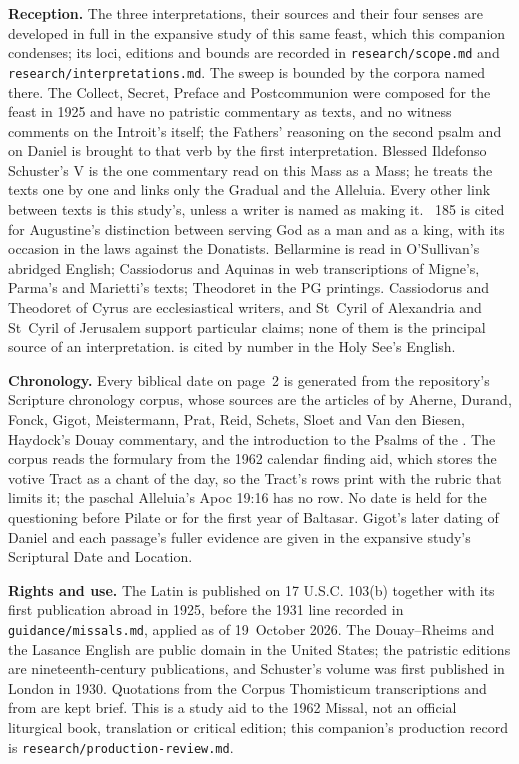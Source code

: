 {\textbf{Reception.} The three interpretations, their sources and their four senses
are developed in full in the expansive study of this same feast, which this
companion condenses; its loci, editions and bounds are recorded in
\texttt{research/scope.md} and \texttt{research/interpretations.md}. The sweep
is bounded by the corpora named there. The Collect, Secret, Preface and
Postcommunion were composed for the feast in 1925 and have no patristic
commentary as texts, and no witness comments on the Introit's
 itself; the Fathers' reasoning on the
second psalm and on Daniel is brought to that verb by the first interpretation.
Blessed Ildefonso Schuster's  V is the one commentary
read on this Mass as a Mass; he treats the texts one by one and links only the
Gradual and the Alleluia. Every other link between texts is this study's,
unless a writer is named as making it. ~185 is cited for Augustine's
distinction between serving God as a man and as a king, with its occasion in
the laws against the Donatists. Bellarmine is read in O'Sullivan's abridged
English; Cassiodorus and Aquinas in web transcriptions of Migne's, Parma's and
Marietti's texts; Theodoret in the PG printings. Cassiodorus and Theodoret
of Cyrus are ecclesiastical writers, and St~Cyril of Alexandria and St~Cyril
of Jerusalem support particular claims; none of them is the principal source
of an interpretation.
 is cited by number in the Holy See's English.

\textbf{Chronology.} Every biblical date on page~2 is generated from the
repository's Scripture chronology corpus, whose sources are the articles of
 by Aherne, Durand, Fonck, Gigot, Meistermann,
Prat, Reid, Schets, Sloet and Van den Biesen, Haydock's Douay commentary, and
the introduction to the Psalms of the . The corpus reads the formulary from the 1962 calendar finding aid,
which stores the votive Tract as a chant of the day, so the Tract's rows
print with the rubric that limits it; the paschal Alleluia's Apoc 19:16 has
no row. No date is held for the questioning before Pilate or for the first
year of Baltasar. Gigot's later dating of Daniel and each passage's fuller
evidence are given in the expansive study's Scriptural Date and Location.

\textbf{Rights and use.} The Latin is published on 17 U.S.C. 103(b) together
with its first publication abroad in 1925, before the 1931 line recorded in
\texttt{guidance/missals.md}, applied as of 19~October 2026. The Douay--Rheims
and the Lasance English are public domain in the United States; the patristic
editions are nineteenth-century publications, and Schuster's volume was first
published in London in 1930. Quotations from the Corpus Thomisticum
transcriptions and from  are kept brief. This is a study
aid to the 1962 Missal, not an official liturgical book, translation or
critical edition; this companion's production record is
\texttt{research/production-review.md}.
\par}

